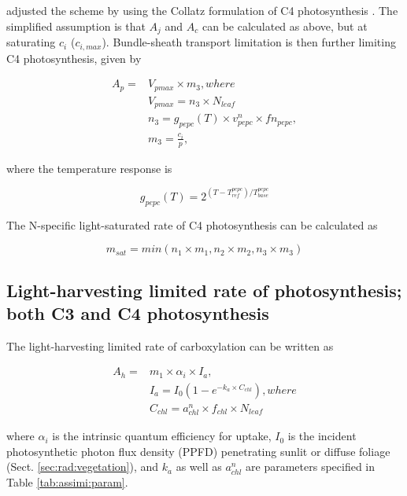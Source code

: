 \cite{Friend:2009tf} adjusted the scheme by \cite{Kull:1998cr} using the Collatz formulation of C4 photosynthesis \cite{Collatz:1992us}. The simplified assumption is that $A_j$ and $A_c$ can be calculated as above, but at saturating $c_i$ ($c_{i,max}$). Bundle-sheath transport limitation is then further limiting C4 photosynthesis, given by

\begin{subequations}\label{eq:pepc}
\begin{align}
A_p=& V_{pmax} \times m_3, where \\
&V_{pmax} = n_3 \times N_{leaf} \\
&n_3 =  g_{pepc}(T) \times v_{pepc}^n \times fn_{pepc}, \\
&m_3 = \frac{c_i}{p},
\end{align} 
\end{subequations} 

where the temperature response is 

\begin{equation}\label{eq:pepc_t_sensitivity}
g_{pepc}(T) = 2^{(T - T_{ref}^{pepc})/ T_{base}^{pepc}}
\end{equation}

The N-specific light-saturated rate of C4 photosynthesis can be calculated as 

\begin{equation}
m_{sat} = min(n_1 \times m_1, n_2 \times m_2, n_3 \times m_3)
\end{equation}

\subsection{Light-harvesting limited rate of photosynthesis; both C3 and C4 photosynthesis}

The light-harvesting limited rate of carboxylation can be written as 

\begin{subequations}
\begin{align}\label{eq:ps_lightharvesting}
A_h =&  m_1 \times \alpha_i \times I_a,\\
&I_a = I_0 (1-e^{-k_a \times C_{chl}}), where\\
&C_{chl} = a_{chl}^n \times f_{chl} \times  N_{leaf}
\end{align} 
\end{subequations} 

where $\alpha_i$ is the intrinsic quantum efficiency for  uptake, $I_0$ is the  incident photosynthetic photon flux density (PPFD) penetrating sunlit or diffuse foliage (Sect. \ref{sec:rad:vegetation}), and $k_a$ as well as $a_{chl}^n$ are parameters specified in Table \ref{tab:assimi:param}.

